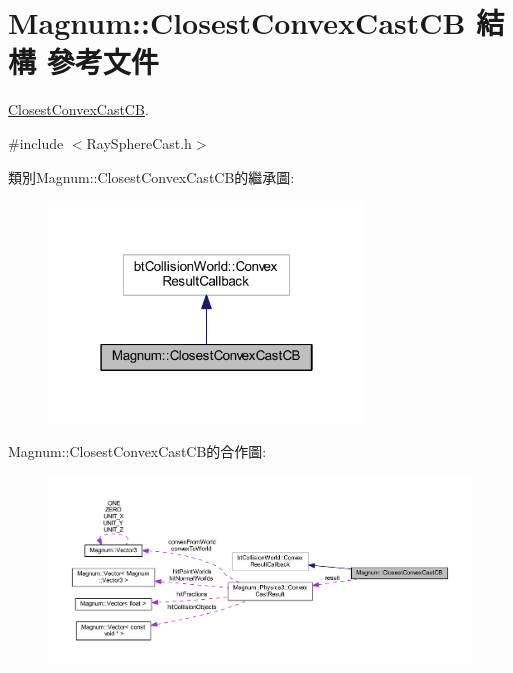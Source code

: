 \hypertarget{struct_magnum_1_1_closest_convex_cast_c_b}{}\section{Magnum\+:\+:Closest\+Convex\+Cast\+CB 結構 參考文件}
\label{struct_magnum_1_1_closest_convex_cast_c_b}


\hyperlink{struct_magnum_1_1_closest_convex_cast_c_b}{Closest\+Convex\+Cast\+CB}.  




{\ttfamily \#include $<$Ray\+Sphere\+Cast.\+h$>$}



類別\+Magnum\+:\+:Closest\+Convex\+Cast\+C\+B的繼承圖\+:\nopagebreak
\begin{figure}[H]
\begin{center}
\leavevmode
\includegraphics[width=238pt]{struct_magnum_1_1_closest_convex_cast_c_b__inherit__graph}
\end{center}
\end{figure}


Magnum\+:\+:Closest\+Convex\+Cast\+C\+B的合作圖\+:\nopagebreak
\begin{figure}[H]
\begin{center}
\leavevmode
\includegraphics[width=350pt]{struct_magnum_1_1_closest_convex_cast_c_b__coll__graph}
\end{center}
\end{figure}
